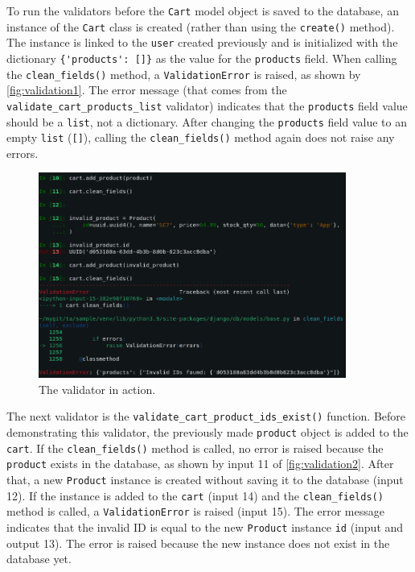 To run the validators before the \verb|Cart| model object is saved to the
database, an instance of the \verb|Cart| class is created (rather than using
the \verb|create()| method). The instance is linked to the \verb|user| created
previously and is initialized with the dictionary \verb|{'products': []}| as
the value for the \verb|products| field. When calling the \verb|clean_fields()|
method, a \verb|ValidationError| is raised, as shown by
\autoref{fig:validation1}. The error message (that comes from the
\verb|validate_cart_products_list| validator) indicates that the
\verb|products| field value should be a \verb|list|, not a dictionary. After
changing the \verb|products| field value to an empty \verb|list| (\verb|[]|),
calling the \verb|clean_fields()| method again does not raise any errors.

\begin{figure}
	\centering
    \includegraphics[width=0.90\textwidth]{pics/validation2.png}
	\caption{The  validator in action.}
	\label{fig:validation2}
\end{figure}

The next validator is the \verb|validate_cart_product_ids_exist()| function.
Before demonstrating this validator, the previously made \verb|product| object
is added to the \verb|cart|. If the \verb|clean_fields()| method is called, no
error is raised because the \verb|product| exists in the database, as shown by
input 11 of \autoref{fig:validation2}. After that, a new \verb|Product|
instance is created without saving it to the database (input 12). If the
instance is added to the \verb|cart| (input 14) and the \verb|clean_fields()|
method is called, a \verb|ValidationError| is raised (input 15). The error
message indicates that the invalid ID is equal to the new \verb|Product|
instance \verb|id| (input and output 13). The error is raised because the
new instance does not exist in the database yet.

